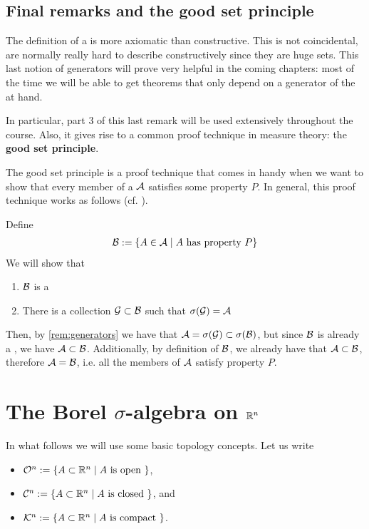 \subsection{Final remarks and the good set principle}

The definition of a \siga is more axiomatic than constructive. This is not coincidental, \sigas are normally really hard to describe constructively since they are huge sets. This last notion of generators will prove very helpful in the coming chapters: most of the time we will be able to get theorems that only depend on a generator of the \siga at hand.

In particular, part 3 of this last remark will be used extensively throughout the course. Also, it gives rise to a common proof technique in measure theory: the \textbf{good set principle}.

\begin{remark}
	\label{rem:good-set-principle}
	The good set principle is a proof technique that comes in handy when we want to show that every member of a \siga $\mathcal{A}$ satisfies some property $P$. In general, this proof technique works as follows (cf. \cite{MOgoodset}).
	
	Define
	\begin{align}
	\mathcal{B} := \{ A \in \mathcal{A} \mid A \text{ has property } P \}
	\end{align}
	We will show that
	\begin{enumerate}
		\item $\mathcal{B}$ is a \siga
		\item There is a collection $\mathcal{G} \subset \mathcal{B}$ such that $\sigma(\mathcal{G}) = \mathcal{A}$
	\end{enumerate}
	
	Then, by \autoref{rem:generators} we have that $\mathcal{A} = \sigma(\mathcal{G}) \subset \sigma(\mathcal{B})$, but since $\mathcal{B}$ is already a \siga, we have $\mathcal{A} \subset \mathcal{B}$. Additionally, by definition of $\mathcal{B}$, we already have that $\mathcal{A} \subset \mathcal{B}$, therefore $\mathcal{A} = \mathcal{B}$, i.e. all the members of $\mathcal{A}$ satisfy property $P$.
\end{remark}

\section{The Borel \texorpdfstring{$\sigma$-algebra on $\mathbb{R}^n$}{sigma algebra on R\textsuperscript{n}}}

In what follows we will use some basic topology concepts. Let us write
\begin{itemize}
	\item $\mathcal{O}^n := \{A \subset \mathbb{R}^n \mid A \text{ is open }\}$,
	\item $\mathcal{C}^n := \{A \subset \mathbb{R}^n \mid A \text{ is closed }\}$, and
	\item $\mathcal{K}^n := \{A \subset \mathbb{R}^n \mid A \text{ is compact }\}$.
\end{itemize}

